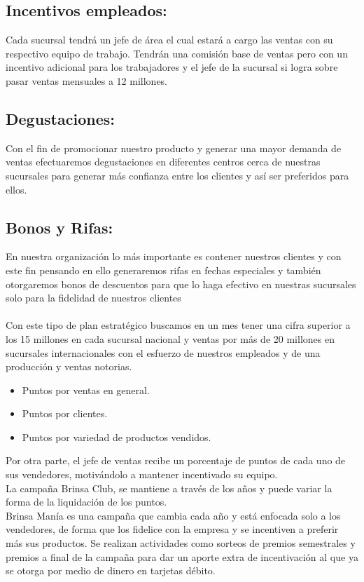 \subsection{Incentivos empleados:}Cada sucursal tendr\'a un jefe de \'area el cual estar\'a a cargo las ventas con su  respectivo equipo de trabajo.  Tendr\'an una comisi\'on base de ventas pero con un incentivo adicional para los trabajadores y el jefe de la sucursal si logra sobre pasar ventas mensuales a 12 millones.%
\subsection{Degustaciones:} Con el fin de promocionar nuestro producto y generar una mayor demanda de ventas  efectuaremos degustaciones en diferentes centros cerca de nuestras sucursales para generar m\'as confianza entre los clientes y as\'i ser preferidos para ellos.
%
\subsection{Bonos y Rifas:} En nuestra  organizaci\'on lo m\'as importante es contener nuestros clientes y con este fin pensando en ello generaremos rifas en fechas especiales y tambi\'en otorgaremos bonos de descuentos para que lo haga efectivo en nuestras sucursales solo para la fidelidad de nuestros clientes 
\\%
\\%
Con este tipo de plan estrat\'egico buscamos en un mes tener una cifra superior a los 15 millones en cada sucursal nacional y ventas por m\'as de 20 millones en sucursales internacionales con el esfuerzo de nuestros empleados y de una producci\'on y ventas notorias. 
\begin{itemize}
	\item Puntos por ventas en general.
	\item Puntos por clientes.
	\item Puntos por variedad de productos vendidos.
\end{itemize}
%
Por otra parte, el jefe de ventas recibe un porcentaje de puntos de cada uno de sus vendedores, motiv\'andolo a mantener incentivado su equipo.%
\\%
La campa\~na Brinsa Club, se mantiene a trav\'es de los a\~nos y puede variar la forma de la liquidaci\'on de los puntos.%
\\%
Brinsa Man\'ia es una campa\~na que cambia cada a\~no y est\'a enfocada solo a los vendedores, de forma que los fidelice con la empresa y se incentiven a preferir m\'as sus productos. Se realizan actividades como sorteos de premios semestrales y premios a final de la campa\~na para dar un aporte extra de incentivaci\'on al que ya se otorga por medio de dinero en tarjetas d\'ebito.%
%
\newpage%
